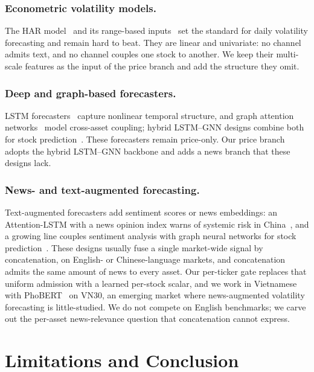 \documentclass[runningheads]{llncs}
\begin{document}
\subsubsection{Econometric volatility models.}
The HAR model~\cite{corsi2009} and its range-based inputs~\cite{parkinson1980} set the standard for
daily volatility forecasting and remain hard to beat. They are linear and univariate: no channel
admits text, and no channel couples one stock to another. We keep their multi-scale features as the
input of the price branch and add the structure they omit.

\subsubsection{Deep and graph-based forecasters.}
LSTM forecasters~\cite{hochreiter1997} capture nonlinear temporal structure, and graph attention
networks~\cite{velickovic2018} model cross-asset coupling; hybrid LSTM--GNN designs combine both for
stock prediction~\cite{sonani2025}. These forecasters remain price-only. Our price branch adopts the
hybrid LSTM--GNN backbone and adds a news branch that these designs lack.

\subsubsection{News- and text-augmented forecasting.}
Text-augmented forecasters add sentiment scores or news embeddings: an Attention-LSTM with a news
opinion index warns of systemic risk in China~\cite{ouyang2021}, and a growing line couples
sentiment analysis with graph neural networks for stock prediction~\cite{das2024}. These designs
usually fuse a single market-wide signal by concatenation, on English- or Chinese-language markets,
and concatenation admits the same amount of news to every asset. Our per-ticker gate replaces that
uniform admission with a learned per-stock scalar, and we work in Vietnamese with
PhoBERT~\cite{phobert2020} on VN30, an emerging market where news-augmented volatility forecasting
is little-studied. We do not compete on English benchmarks; we carve out the per-asset
news-relevance question that concatenation cannot express.

\section{Limitations and Conclusion}
\label{sec:conclusion}
\end{document}
